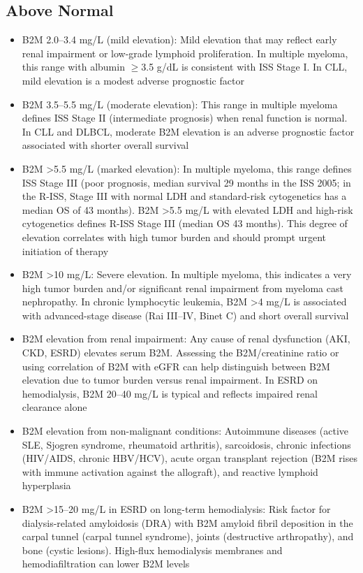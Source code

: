 \subsection*{Above Normal}
\begin{itemize}
  \item B2M 2.0--3.4 mg/L (mild elevation): Mild elevation that may reflect early renal impairment or low-grade lymphoid proliferation. In multiple myeloma, this range with albumin $\geq$3.5 g/dL is consistent with ISS Stage I. In CLL, mild elevation is a modest adverse prognostic factor
  \item B2M 3.5--5.5 mg/L (moderate elevation): This range in multiple myeloma defines ISS Stage II (intermediate prognosis) when renal function is normal. In CLL and DLBCL, moderate B2M elevation is an adverse prognostic factor associated with shorter overall survival
  \item B2M >5.5 mg/L (marked elevation): In multiple myeloma, this range defines ISS Stage III (poor prognosis, median survival 29 months in the ISS 2005; in the R-ISS, Stage III with normal LDH and standard-risk cytogenetics has a median OS of 43 months). B2M >5.5 mg/L with elevated LDH and high-risk cytogenetics defines R-ISS Stage III (median OS 43 months). This degree of elevation correlates with high tumor burden and should prompt urgent initiation of therapy
  \item B2M >10 mg/L: Severe elevation. In multiple myeloma, this indicates a very high tumor burden and/or significant renal impairment from myeloma cast nephropathy. In chronic lymphocytic leukemia, B2M >4 mg/L is associated with advanced-stage disease (Rai III--IV, Binet C) and short overall survival
  \item B2M elevation from renal impairment: Any cause of renal dysfunction (AKI, CKD, ESRD) elevates serum B2M. Assessing the B2M/creatinine ratio or using correlation of B2M with eGFR can help distinguish between B2M elevation due to tumor burden versus renal impairment. In ESRD on hemodialysis, B2M 20--40 mg/L is typical and reflects impaired renal clearance alone
  \item B2M elevation from non-malignant conditions: Autoimmune diseases (active SLE, Sjogren syndrome, rheumatoid arthritis), sarcoidosis, chronic infections (HIV/AIDS, chronic HBV/HCV), acute organ transplant rejection (B2M rises with immune activation against the allograft), and reactive lymphoid hyperplasia
  \item B2M >15--20 mg/L in ESRD on long-term hemodialysis: Risk factor for dialysis-related amyloidosis (DRA) with B2M amyloid fibril deposition in the carpal tunnel (carpal tunnel syndrome), joints (destructive arthropathy), and bone (cystic lesions). High-flux hemodialysis membranes and hemodiafiltration can lower B2M levels
\end{itemize}

